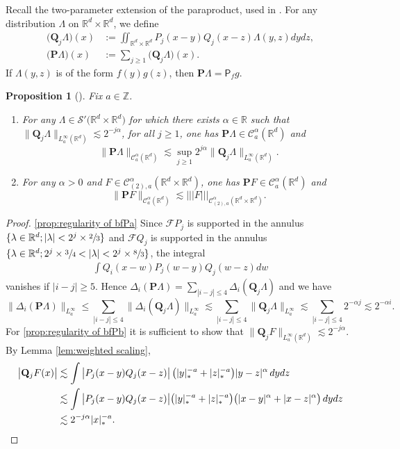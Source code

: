 \documentclass[10pt]{amsart}
\newenvironment{enumeratea}
{\bgroup\def\theenumi{\alph{enumi}}\begin{enumerate}}
{\end{enumerate}\egroup}
\theoremstyle{plain}
\newtheorem{prop}[thm]{Proposition}
\theoremstyle{definition}
\newcommand{\trino}[1]{|\!|\!|#1|\!|\!|}
\newcommand{\bfP}{\mathbf{P}}
\newcommand{\bfQ}{\mathbf{Q}}
\newcommand{\sfP}{\mathsf{P}}
\newcommand{\bbR}{\mathbb{R}}
\newcommand{\bbZ}{\mathbb{Z}}
\newcommand{\mcC}{\mathcal{C}}
\newcommand\mcS{\mathcal{S}}
\begin{document}
Recall the two-parameter extension of the paraproduct, used in \cite{BH}. For any distribution $\Lambda$ on $\bbR^d\times \bbR^d$, we define
\begin{align*}
\bigl(\bfQ_j \Lambda\bigr)(x) &:= \iint_{\bbR^d\times\bbR^d} P_j(x-y)Q_j(x-z) \Lambda(y,z)dydz, \\
\bigl(\bfP \Lambda\bigr)(x) &:= \sum_{j\ge1} \bigl(\bfQ_j\Lambda\bigr)(x).
\end{align*}
If $\Lambda(y,z)$ is of the form $f(y)g(z)$, then $\bfP \Lambda=\sfP_fg$.

\begin{prop}[{\cite[Prop.\,8(a)]{BH}}]
\label{prop:regularity of bfP}
Fix $a\in\bbZ$.
\begin{enumeratea}
	\item\label{prop:regularity of bfPa} For any $\Lambda\in\mcS'\bigl(\bbR^d\times\bbR^d\bigr)$ for which there exists $\alpha\in\bbR$ such that $\big\|\bfQ_j\Lambda\big\|_{L_a^\infty(\bbR^d)}\lesssim2^{-j\alpha}$, for all $j\ge1$, one has $\bfP\Lambda\in \mcC_a^\alpha(\bbR^d)$ and
\[
\|\bfP\Lambda\|_{\mcC_a^\alpha(\bbR^d)} \lesssim\sup_{j\ge1}2^{j\alpha} \big\|\bfQ_j\Lambda\big\|_{L_a^\infty(\bbR^d)}.
\]
	\item\label{prop:regularity of bfPb} For any $\alpha>0$ and $F\in\mcC_{(2),a}^\alpha(\bbR^d\times\bbR^d)$, one has $\bfP F\in \mcC_a^\alpha(\bbR^d)$ and
\[
\|\bfP F\|_{\mcC_a^\alpha(\bbR^d)}\lesssim\trino{F}_{\mcC_{(2),a}^\alpha(\bbR^d\times\bbR^d)}.
\]
\end{enumeratea}
\end{prop}

\skpt
\begin{proof}
\eqref{prop:regularity of bfPa} Since $\mathscr{F} P_j$ is supported in the annulus $\{\lambda\in\bbR^d ; |\lambda|<2^j\times\sfrac23\}$ and $\mathscr{F} Q_j$ is supported in the annulus $\{\lambda\in\bbR^d ; 2^j\times\sfrac34 < |\lambda| < 2^j\times\sfrac83\}$, the integral
\begin{align*}
\int Q_i(x-w)P_j(w-y)Q_j(w-z)dw
\end{align*}
vanishes if $|i-j|\ge5$. Hence $\Delta_i({\bfP} \Lambda)=\sum_{|i-j|\le4}\Delta_i(\bfQ_j\Lambda)$ and we have
\[
\|\Delta_i({\bfP} \Lambda)\|_{L^\infty_a}
\le\sum_{|i-j|\le4}\|\Delta_i(\bfQ_j\Lambda)\|_{L^\infty_a}
\lesssim\sum_{|i-j|\le4}\|\bfQ_j\Lambda\|_{L^\infty_a}
\lesssim\sum_{|i-j|\le4}2^{-\alpha j}
\lesssim2^{-\alpha i}.
\]
For \eqref{prop:regularity of bfPb} it is sufficient to show that $\big\|\bfQ_jF\big\|_{L_a^\infty(\bbR^d)}\lesssim2^{-j\alpha}$. By Lemma \ref{lem:weighted scaling},
\begin{align*}
\big|\bfQ_jF(x)\big| &\lesssim \int \big|P_j(x-y)Q_j(x-z)\big| \,\bigl(|y|_*^{-a}+|z|_*^{-a}\bigr) |y-z|^\alpha\, dydz \\
&\lesssim \int \big|P_j(x-y)Q_j(x-z)\big| \bigl(|y|_*^{-a}+|z|_*^{-a}\bigr) \bigl(|x-y|^\alpha+|x-z|^\alpha\bigr) \,dydz \\
&\lesssim2^{-j\alpha}|x|_*^{-a}.\qedhere
\end{align*}
\end{proof}
\end{document}
